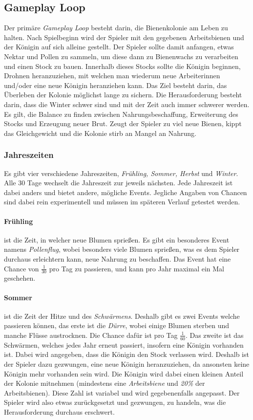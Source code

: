 \subsection{Gameplay Loop}
Der primäre \textit{Gameplay Loop} besteht darin, die Bienenkolonie am Leben zu halten. Nach Spielbeginn wird der Spieler mit den gegebenen Arbeitsbienen und der Königin auf sich alleine gestellt. Der Spieler sollte damit anfangen, etwas Nektar und Pollen zu sammeln, um diese dann zu Bienenwachs zu verarbeiten und einen Stock zu bauen. Innerhalb dieses Stocks sollte die Königin beginnen, Drohnen heranzuziehen, mit welchen man wiederum neue Arbeiterinnen und/oder eine neue Königin heranziehen kann. Das Ziel besteht darin, das Überleben der Kolonie möglichst lange zu sichern. Die Herausforderung besteht darin, dass die Winter schwer sind und mit der Zeit auch immer schwerer werden. Es gilt, die Balance zu finden zwischen Nahrungsbeschaffung, Erweiterung des Stocks und Erzeugung neuer Brut. Zeugt der Spieler zu viel neue Bienen, kippt das Gleichgewicht und die Kolonie stirb an Mangel an Nahrung.

\subsubsection{Jahreszeiten}
Es gibt vier verschiedene Jahreszeiten, \textit{Frühling, Sommer, Herbst} und \textit{Winter}. Alle 30 Tage wechselt die Jahreszeit zur jeweils nächsten. Jede Jahreszeit ist dabei anders und bietet andere, mögliche Events. Jegliche Angaben von Chancen sind dabei rein experimentell und müssen im späteren Verlauf getestet werden.

\paragraph{Frühling} ist die Zeit, in welcher neue Blumen sprießen. Es gibt ein besonderes Event namens \textit{Pollenflug}, wobei besonders viele Blumen sprießen, was es dem Spieler durchaus erleichtern kann, neue Nahrung zu beschaffen. Das Event hat eine Chance von $\frac{1}{30}$ pro Tag zu passieren, und kann pro Jahr maximal ein Mal geschehen.

\paragraph{Sommer} ist die Zeit der Hitze und des \textit{Schwärmens}. Deshalb gibt es zwei Events welche passieren können, das erste ist die \textit{Dürre}, wobei einige Blumen sterben und manche Flüsse austrocknen. Die Chance dafür ist pro Tag $\frac{1}{60}$. Das zweite ist das Schwärmen, welches jedes Jahr erneut passiert, insofern eine Königin vorhanden ist. Dabei wird angegeben, dass die Königin den Stock verlassen wird. Deshalb ist der Spieler dazu gezwungen, eine neue Königin heranzuziehen, da ansonsten keine Königin mehr vorhanden sein wird. Die Königin wird dabei einen kleinen Anteil der Kolonie mitnehmen (mindestens eine \textit{Arbeitsbiene} und \textit{20\%} der Arbeitsbienen). Diese Zahl ist variabel und wird gegebenenfalls angepasst. Der Spieler wird also etwas zurückgesetzt und gezwungen, zu handeln, was die Herausforderung durchaus erschwert. 

